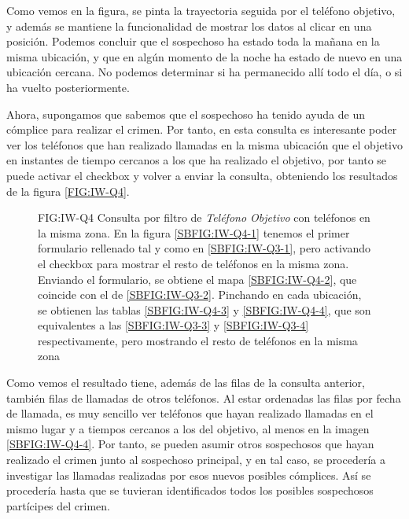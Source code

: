     Como vemos en la figura, se pinta la trayectoria seguida por el teléfono objetivo, y además se mantiene la funcionalidad de mostrar los datos al clicar en una posición. 
    Podemos concluir que el sospechoso ha estado toda la mañana en la misma ubicación, y que en algún momento de la noche ha estado de nuevo en una ubicación cercana. No podemos determinar si ha permanecido allí todo el día, o si ha vuelto posteriormente.
    
    Ahora, supongamos que sabemos que el sospechoso ha tenido ayuda de un cómplice para realizar el crimen. Por tanto, en esta consulta es interesante poder ver los teléfonos que han realizado llamadas en la misma ubicación que el objetivo en instantes de tiempo cercanos a los que ha realizado el objetivo, por tanto se puede activar el checkbox y volver a enviar la consulta, obteniendo los resultados de la figura \ref{FIG:IW-Q4}. 
    
    \begin{figure}[Consulta por filtro de \textit{Teléfono Objetivo} con teléfonos en la misma zona]{FIG:IW-Q4}
      {Consulta por filtro de \textit{Teléfono Objetivo} con teléfonos en la misma zona. En la figura \ref{SBFIG:IW-Q4-1} tenemos el primer formulario rellenado tal y como en \ref{SBFIG:IW-Q3-1}, pero activando el checkbox para mostrar el resto de teléfonos en la misma zona. Enviando el formulario, se obtiene el mapa \ref{SBFIG:IW-Q4-2}, que coincide con el de \ref{SBFIG:IW-Q3-2}. Pinchando en cada ubicación, se obtienen las tablas \ref{SBFIG:IW-Q4-3} y \ref{SBFIG:IW-Q4-4}, que son equivalentes a las \ref{SBFIG:IW-Q3-3} y \ref{SBFIG:IW-Q3-4} respectivamente, pero mostrando el resto de teléfonos en la misma zona}
      \quad
      \quad
      \quad
    \end{figure}
    
    Como vemos el resultado tiene, además de las filas de la consulta anterior, también filas de llamadas de otros teléfonos.
    Al estar ordenadas las filas por fecha de llamada, es muy sencillo ver teléfonos que hayan realizado llamadas en el mismo lugar y a tiempos cercanos a los del objetivo, al menos en la imagen \ref{SBFIG:IW-Q4-4}. Por tanto, se pueden asumir otros sospechosos que hayan realizado el crimen junto al sospechoso principal, y en tal caso, se procedería a investigar las llamadas realizadas por esos nuevos posibles cómplices. Así se procedería hasta que se tuvieran identificados todos los posibles sospechosos partícipes del crimen.
